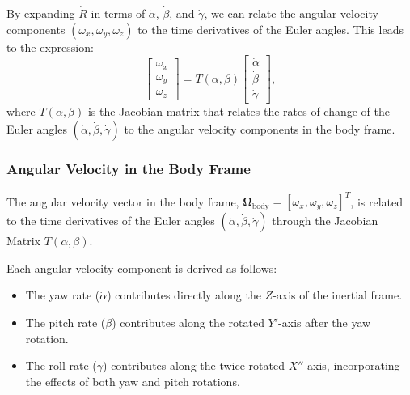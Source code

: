 \documentclass[12pt]{article}
\begin{document}
By expanding \(\dot{R}\) in terms of \(\dot{\alpha}\), \(\dot{\beta}\), and \(\dot{\gamma}\), we can relate the angular velocity components \((\omega_x, \omega_y, \omega_z)\) to the time derivatives of the Euler angles. This leads to the expression:
\begin{equation}
\label{eq:omega_body_decomposition}
\begin{bmatrix}
\omega_x \\
\omega_y \\
\omega_z
\end{bmatrix}
=
T(\alpha, \beta)
\begin{bmatrix}
\dot{\alpha} \\
\dot{\beta} \\
\dot{\gamma}
\end{bmatrix},
\end{equation}
where \(T(\alpha, \beta)\) is the Jacobian matrix that relates the rates of change of the Euler angles \((\dot{\alpha}, \dot{\beta}, \dot{\gamma})\) to the angular velocity components in the body frame.

\subsubsection{Angular Velocity in the Body Frame}

The angular velocity vector in the body frame, \(\boldsymbol{\Omega}_{\text{body}} = [\omega_x, \omega_y, \omega_z]^T\), is related to the time derivatives of the Euler angles \((\dot{\alpha}, \dot{\beta}, \dot{\gamma})\) through the Jacobian Matrix \(T(\alpha, \beta)\). 

Each angular velocity component is derived as follows:
\begin{itemize}
    \item The yaw rate (\(\dot{\alpha}\)) contributes directly along the \(Z\)-axis of the inertial frame.
    \item The pitch rate (\(\dot{\beta}\)) contributes along the rotated \(Y'\)-axis after the yaw rotation.
    \item The roll rate (\(\dot{\gamma}\)) contributes along the twice-rotated \(X''\)-axis, incorporating the effects of both yaw and pitch rotations.
\end{itemize}
\end{document}
